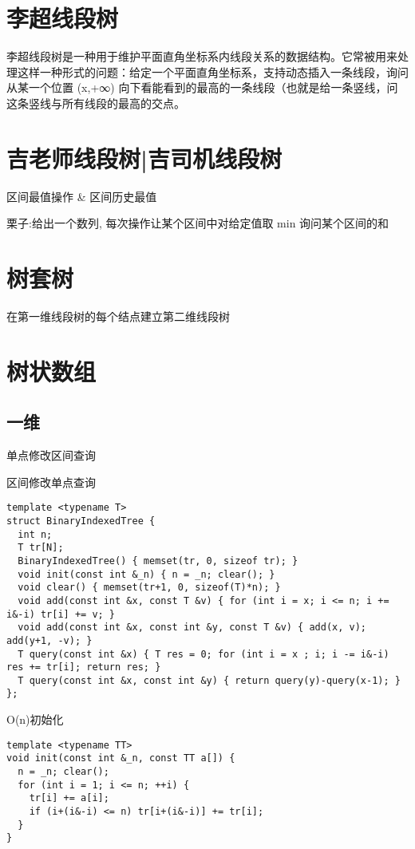 \documentclass[12pt]{article}
\begin{document}
{{{{{{{{{{{{{{{{\section{李超线段树}

李超线段树是一种用于维护平面直角坐标系内线段关系的数据结构。它常被用来处理这样一种形式的问题：给定一个平面直角坐标系，支持动态插入一条线段，询问从某一个位置 (x,+∞) 向下看能看到的最高的一条线段（也就是给一条竖线，问这条竖线与所有线段的最高的交点。

\section{吉老师线段树|吉司机线段树}

区间最值操作 \& 区间历史最值

栗子:给出一个数列, 每次操作让某个区间中对给定值取 min 询问某个区间的和

\section{树套树}

在第一维线段树的每个结点建立第二维线段树

\section{树状数组}
\subsection{一维}
单点修改区间查询

区间修改单点查询

{\setmainfont{Consolas}
\begin{lstlisting}
template <typename T>
struct BinaryIndexedTree {
  int n;
  T tr[N];
  BinaryIndexedTree() { memset(tr, 0, sizeof tr); }
  void init(const int &_n) { n = _n; clear(); }
  void clear() { memset(tr+1, 0, sizeof(T)*n); }
  void add(const int &x, const T &v) { for (int i = x; i <= n; i += i&-i) tr[i] += v; }
  void add(const int &x, const int &y, const T &v) { add(x, v); add(y+1, -v); }
  T query(const int &x) { T res = 0; for (int i = x ; i; i -= i&-i) res += tr[i]; return res; }
  T query(const int &x, const int &y) { return query(y)-query(x-1); }
};
\end{lstlisting}

O(n)初始化
{\setmainfont{Consolas}
\begin{lstlisting}
template <typename TT>
void init(const int &_n, const TT a[]) {
  n = _n; clear();
  for (int i = 1; i <= n; ++i) {
    tr[i] += a[i];
    if (i+(i&-i) <= n) tr[i+(i&-i)] += tr[i];
  }
}
\end{lstlisting}
}}}}}}}}}}}}}}}}}}
\end{document}
